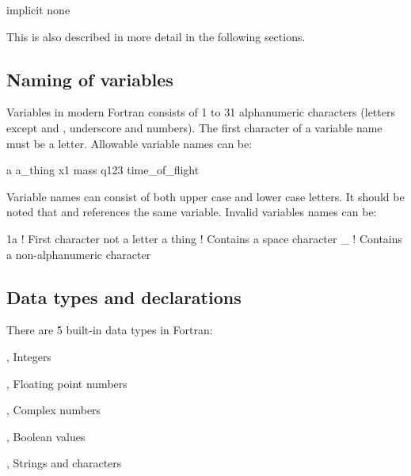 \begin{fortrancodeenv}
implicit none
\end{fortrancodeenv}

This is also described in more detail in the following sections.

\subsection{Naming of variables}

Variables in modern Fortran consists of 1 to 31 alphanumeric characters (letters except   and , underscore and numbers). The first character of a variable name must be a letter. Allowable variable names can be:

\begin{fortrancodeenv}
a
a_thing
x1
mass
q123
time_of_flight
\end{fortrancodeenv}

Variable names can consist of both upper case and lower case letters. It should be noted that  and  references the same variable. Invalid variables names can be:

\begin{fortrancodeenv}
1a      ! First character not a letter
a thing ! Contains a space character
_       ! Contains a non-alphanumeric character
\end{fortrancodeenv}

\subsection{Data types and declarations}

There are 5 built-in data types in Fortran:

\begin{xlist}
    \item {}, Integers
    \item {}, Floating point numbers
    \item {}, Complex numbers
    \item {}, Boolean values
    \item {}, Strings and characters
\end{xlist}


